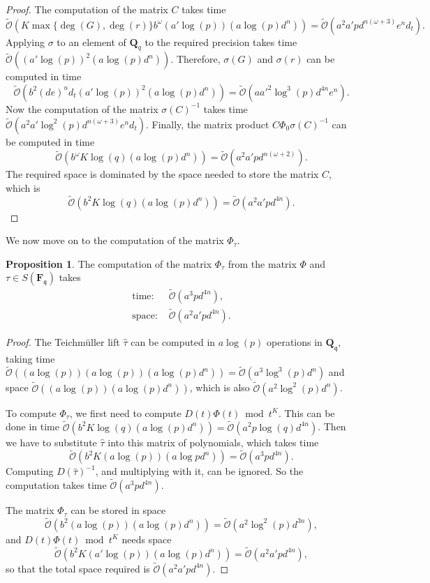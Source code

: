 \documentclass[a4paper,11pt]{article}
\numberwithin{equation}{section}
\newcommand{\QQ}{\mathbf{Q}} %
\newcommand{\FF}{\mathbf{F}} %
\theoremstyle{definition}
\newtheorem{prop}[thm]{Proposition}
\begin{document}
\begin{proof}
The computation of the matrix $C$ takes time
\[
\tilde{\mathcal{O}}(K \max\{\deg(G),\deg(r)\} b^{\omega} (a'\log(p)) (a \log(p) d^n)) = 
\tilde{\mathcal{O}}(a^2 a' p d^{n(\omega+3)}e^n d_t).
\] 
Applying $\sigma$ to an element of $\QQ_q$ to the required precision
takes time $\tilde{\mathcal{O}}((a' \log(p))^2(a\log(p)d^n))$. Therefore, $\sigma(G)$ and $\sigma(r)$ 
can be computed in time 
\[
\tilde{\mathcal{O}}(b^2 (de)^n d_t (a' \log(p))^2 (a\log(p)d^n))=\tilde{\mathcal{O}}(a a'^2 \log^3(p) d^{4n} e^n ).
\] 
Now the computation of the matrix $\sigma(C)^{-1}$ takes time $\tilde{\mathcal{O}}(a^2 a' \log^2(p) d^{n(\omega+3)}e^n d_t)$. 
Finally, the matrix product $C \Phi_0 \sigma(C)^{-1}$ can be computed in time 
\[
\tilde{\mathcal{O}}(b^{\omega} K \log(q) (a \log(p) d^n)) = \tilde{\mathcal{O}}(a^2 a' p d^{n(\omega+2)}).
\]
The required space is dominated by the space needed to store the matrix $C$, which is
\[
\tilde{\mathcal{O}}(b^2 K \log(q) (a \log(p) d^n)) = \tilde{\mathcal{O}}(a^2 a' p d^{4n}).
\]
\end{proof}

We now move on to the computation of the matrix $\Phi_{\tau}$.

\begin{prop}
The computation of the matrix $\Phi_{\tau}$ from the matrix $\Phi$ and $\tau \in S(\FF_{\mathfrak{q}})$ takes
\begin{align*}
\mbox{time: }  &\tilde{\mathcal{O}}(a^3 p d^{4n}), \\
\mbox{space: } &\tilde{\mathcal{O}}(a^2 a' p d^{4n}).
\end{align*}
\end{prop}

\begin{proof}
The Teichm\"uller lift $\hat{\tau}$ can be computed in $a \log(p)$ operations
in $\QQ_{\mathfrak{q}}$, taking time 
$\tilde{\mathcal{O}}((a \log(p))(a \log(p)) (a \log(p) d^n))=\tilde{\mathcal{O}}(a^3 \log^3(p) d^n)$ 
and space $\tilde{\mathcal{O}}((a \log(p)) (a \log(p) d^n))$, which is also $\tilde{\mathcal{O}}(a^2 \log^2(p) d^n)$. 

To compute $\Phi_{\tau}$, we first need to compute 
$D(t) \Phi(t) \bmod{t^{K}}$. This can be done in time 
$\tilde{\mathcal{O}}(b^2 K \log(q) (a \log(p) d^n))=\tilde{\mathcal{O}}(a^2 p \log(q) d^{4n})$.
Then we have to substitute $\hat{\tau}$ into this matrix of polynomials, which takes time
\[
\tilde{\mathcal{O}}(b^2 K (a \log(p)) (a \log p d^n))=\tilde{\mathcal{O}}(a^3 p d^{4n}).
\]
Computing $D(\hat{\tau})^{-1}$, and multiplying with it, can be ignored. So the 
computation takes time $\tilde{\mathcal{O}}(a^3 p d^{4n})$.

The matrix $\Phi_{\tau}$ can be stored in space
\[
\tilde{\mathcal{O}}(b^2 (a \log(p))(a \log(p) d^n)) = \tilde{\mathcal{O}}(a^2 \log^2(p)  d^{3n}),
\]
and $D(t) \Phi(t) \bmod{t^{K}}$ needs space
 \[
\tilde{\mathcal{O}}(b^2 K (a' \log(p)) (a \log(p) d^n))= \tilde{\mathcal{O}}(a^2 a' p d^{4n}),
\]
so that the total space required is $\tilde{\mathcal{O}}(a^2 a' p d^{4n})$.
\end{proof}
\end{document}
